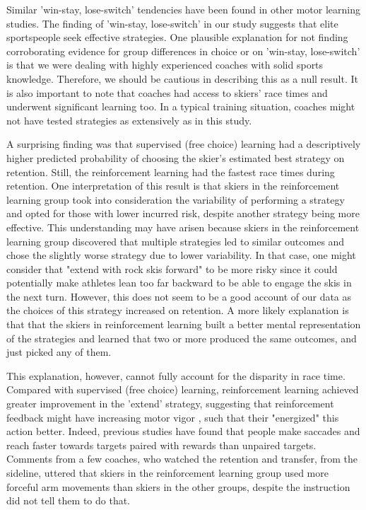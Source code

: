 \documentclass{article}
\begin{document}
Similar 'win-stay, lose-switch' tendencies have been found in other motor learning studies. The finding of 'win-stay, lose-switch' in our study suggests that elite sportspeople seek effective strategies. One plausible explanation for not finding corroborating evidence for group differences in choice or on 'win-stay, lose-switch' is that we were dealing with highly experienced coaches with solid sports knowledge. Therefore, we should be cautious in describing this as a null result. It is also important to note that coaches had access to skiers' race times and underwent significant learning too. In a typical training situation, coaches might not have tested strategies as extensively as in this study.  

A surprising finding was that supervised (free choice) learning had a descriptively higher predicted probability of choosing the skier's estimated best strategy on retention. Still, the reinforcement learning had the fastest race times during retention. One interpretation of this result is that skiers in the reinforcement learning group took into consideration the variability of performing a strategy and opted for those with lower incurred risk, despite another strategy being more effective. This understanding may have arisen because skiers in the reinforcement learning group discovered that multiple strategies led to similar outcomes and chose the slightly worse strategy due to lower variability. In that case, one might consider that "extend with rock skis forward" to be more risky since it could potentially make athletes lean too far backward to be able to engage the skis in the next turn. However, this does not seem to be a good account of our data as the choices of this strategy increased on retention. A more likely explanation is that that the skiers in reinforcement learning built a better mental representation of the strategies and learned that two or more produced the same outcomes, and just picked any of them.

This explanation, however, cannot fully account for the disparity in race time. Compared with supervised (free choice) learning, reinforcement learning achieved greater improvement in the 'extend' strategy, suggesting that reinforcement feedback might have increasing motor vigor \cite{pietro_mazzoni_why_2007, dudman_basal_2016}, such that their "energized" this action better. Indeed, previous studies have found that people make saccades \cite{takikawa_modulation_2002} and reach\cite{summerside_vigor_2018} faster towards targets paired with rewards than unpaired targets. Comments from a few coaches, who watched the retention and transfer, from the sideline, uttered that skiers in the reinforcement learning group used more forceful arm movements than skiers in the other groups, despite the instruction did not tell them to do that.
\end{document}
